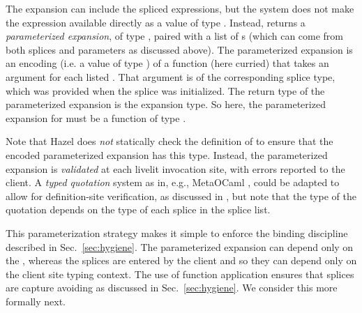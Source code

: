 The expansion can include the spliced expressions, 
but the system does not make the expression  
available directly as a value of type . 
Instead,  returns a \emph{parameterized expansion}, of type , 
paired with a list of s (which can come from 
both splices and parameters as discussed above).
The {parameterized expansion}
 is an encoding (i.e. a value of type ) of a function 
 (here curried)
 that takes an argument for each listed . 
 That argument is of the corresponding splice 
type, which was provided when the splice was initialized. 
 The return type of the parameterized expansion is the expansion type.
 So here, the parameterized expansion for  must be a function of type 
 .

Note that Hazel does \emph{not} statically check the definition of 
to ensure that the encoded parameterized expansion has this type. Instead, the parameterized expansion 
is \emph{validated} at each livelit invocation site, with errors reported to the client. 
A \emph{typed quotation} system as in, e.g., MetaOCaml \cite{DBLP:conf/flops/Kiselyov14}, could be adapted to allow for definition-site verification, as discussed in \cite{TLMs}, but 
note that   
the type of the quotation depends on the type of each splice in 
the splice list.

This parameterization strategy makes it simple to enforce the binding discipline described in Sec.~\ref{sec:hygiene}. 
The parameterized expansion 
can depend only on the , whereas the splices are entered by the client and so they can 
depend only on the client site typing context. The use of function application ensures
that splices are capture avoiding as discussed in Sec.~\ref{sec:hygiene}. 
We consider this more formally next.
